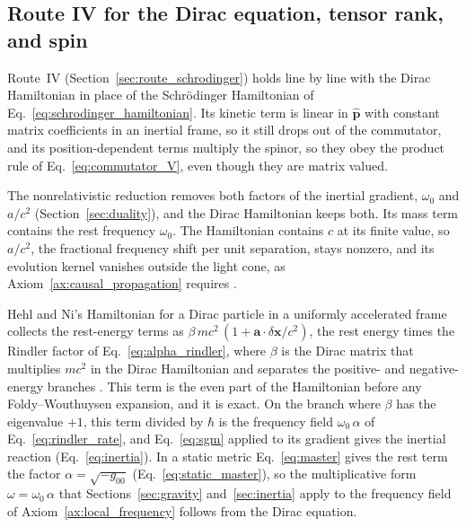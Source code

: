 \documentclass[aps,prd,onecolumn,tightenlines,nofootinbib,notitlepage,11pt,floatfix]{revtex4-2}
\theoremstyle{indentedtheorem}
\begin{document}
\subsection{Route IV for the Dirac equation, tensor rank, and spin}
\label{sec:dirac}

Route~IV (Section~\ref{sec:route_schrodinger}) holds line by line with the Dirac Hamiltonian \citep{Dirac1928Quantum} in place of the Schr\"odinger Hamiltonian of Eq.~\eqref{eq:schrodinger_hamiltonian}. Its kinetic term is linear in $\hat{\mathbf{p}}$ with constant matrix coefficients in an inertial frame, so it still drops out of the commutator, and its position-dependent terms multiply the spinor, so they obey the product rule of Eq.~\eqref{eq:commutator_V}, even though they are matrix valued.

The nonrelativistic reduction removes both factors of the inertial gradient, $\omega_0$ and $a/c^2$ (Section~\ref{sec:duality}), and the Dirac Hamiltonian keeps both. Its mass term contains the rest frequency $\omega_0$. The Hamiltonian contains $c$ at its finite value, so $a/c^2$, the fractional frequency shift per unit separation, stays nonzero, and its evolution kernel vanishes outside the light cone, as Axiom~\ref{ax:causal_propagation} requires \citep{Thaller1992Dirac}.

Hehl and Ni's Hamiltonian for a Dirac particle in a uniformly accelerated frame collects the rest-energy terms as $\beta \, mc^2 \, (1+\mathbf{a}\cdot\delta\mathbf{x}/c^2)$, the rest energy times the Rindler factor of Eq.~\eqref{eq:alpha_rindler}, where $\beta$ is the Dirac matrix that multiplies $mc^2$ in the Dirac Hamiltonian and separates the positive- and negative-energy branches \citep{HehlNi1990Inertial}. This term is the even part of the Hamiltonian before any Foldy--Wouthuysen expansion, and it is exact. On the branch where $\beta$ has the eigenvalue $+1$, this term divided by $\hbar$ is the frequency field $\omega_0 \, \alpha$ of Eq.~\eqref{eq:rindler_rate}, and Eq.~\eqref{eq:sgm} applied to its gradient gives the inertial reaction (Eq.~\eqref{eq:inertia}). In a static metric Eq.~\eqref{eq:master} gives the rest term the factor $\alpha=\sqrt{-g_{00}}$ (Eq.~\eqref{eq:static_master}), so the multiplicative form $\omega=\omega_0 \, \alpha$ that Sections~\ref{sec:gravity} and~\ref{sec:inertia} apply to the frequency field of Axiom~\ref{ax:local_frequency} follows from the Dirac equation.
\end{document}
